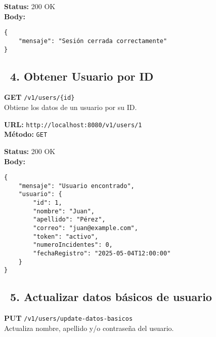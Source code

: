\begin{tcolorbox}[response]
    \textbf{Status:} 200 OK\\
    \textbf{Body:}
    \begin{verbatim}
{
    "mensaje": "Sesión cerrada correctamente"
}
    \end{verbatim}
\end{tcolorbox}

\subsection*{\faServer\ 4. Obtener Usuario por ID}
\begin{tcolorbox}[endpoint]
    \textbf{GET} \texttt{/v1/users/\{id\}}\\
    Obtiene los datos de un usuario por su ID.
\end{tcolorbox}

\begin{tcolorbox}[request]
    \textbf{URL:} \textcolor{urlColor}{\texttt{http://localhost:8080/v1/users/1}}\\
    \textbf{Método:} \textcolor{methodColor}{\texttt{GET}}
\end{tcolorbox}

\begin{tcolorbox}[response]
    \textbf{Status:} 200 OK\\
    \textbf{Body:}
    \begin{verbatim}
{
    "mensaje": "Usuario encontrado",
    "usuario": {
        "id": 1,
        "nombre": "Juan",
        "apellido": "Pérez",
        "correo": "juan@example.com",
        "token": "activo",
        "numeroIncidentes": 0,
        "fechaRegistro": "2025-05-04T12:00:00"
    }
}
    \end{verbatim}
\end{tcolorbox}

\subsection*{\faServer\ 5. Actualizar datos básicos de usuario}
\begin{tcolorbox}[endpoint]
    \textbf{PUT} \texttt{/v1/users/update-datos-basicos}\\
    Actualiza nombre, apellido y/o contraseña del usuario.
\end{tcolorbox}

